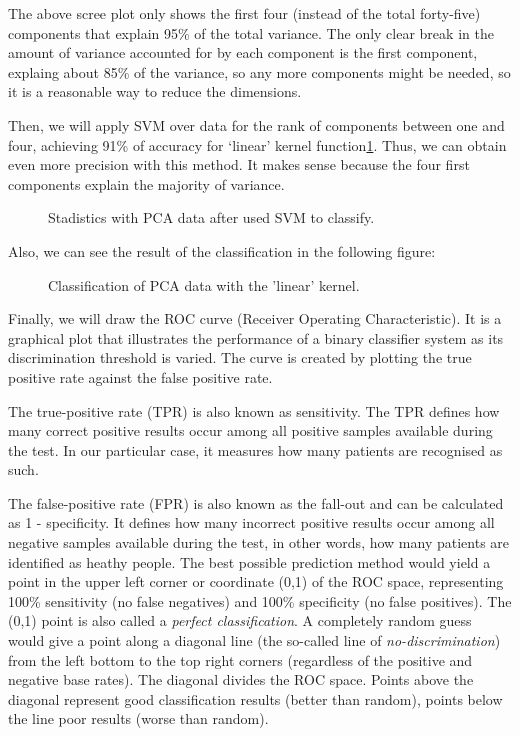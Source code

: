 The above scree plot only shows the first four (instead of the total forty-five) components that explain 95\% of the total variance. The only clear break in the amount of variance accounted for by each component is the first component, explaing about 85\% of the variance, so any more components might be needed, so it is  a reasonable way to reduce the dimensions.

Then, we will apply SVM over data for the rank of components between one and four, achieving 91\% of accuracy for ‘linear’ kernel function\ref{fig:stadistics_PCA}. Thus, we can obtain even more precision with this method. It makes sense because the four first components explain the majority of variance.

\begin{figure}[H]
	\centering
	\caption{Stadistics with PCA data after used SVM to classify.}
	\label{fig:stadistics_PCA}
\end{figure}

Also, we can see the result of the classification in the following figure:

\begin{figure}[H]
	\centering
	\caption{Classification of PCA data with the 'linear' kernel.}
	\label{fig:Classification3D_PCA}
\end{figure}

Finally, we will draw the ROC curve (Receiver Operating Characteristic). It  is a graphical plot that illustrates the performance of a binary classifier system as its discrimination threshold is varied. The curve is created by plotting the true positive rate against the false positive rate\cite{ROC1}.

The true-positive rate (TPR) is also known as sensitivity. The TPR defines how many correct positive results occur among all positive samples available during the test. In our particular case, it measures how many patients are recognised as such.

The false-positive rate (FPR) is also known as the fall-out and can be calculated as 1 - specificity. It defines how many incorrect positive results occur among all negative samples available during the test, in other words, how many patients are identified as heathy people.
The best possible prediction method would yield a point in the upper left corner or coordinate (0,1) of the ROC space, representing 100\% sensitivity (no false negatives) and 100\% specificity (no false positives). The (0,1) point is also called a \textit{perfect classification}. A completely random guess would give a point along a diagonal line (the so-called line of \textit{no-discrimination}) from the left bottom to the top right corners (regardless of the positive and negative base rates). The diagonal divides the ROC space. Points above the diagonal represent good classification results (better than random), points below the line poor results (worse than random)\cite{ROC1}.


